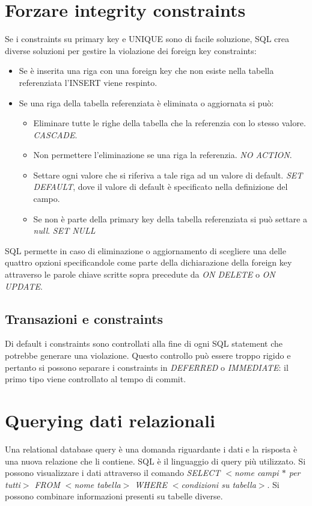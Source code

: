 \section{Forzare integrity constraints}
Se i constraints su primary key e UNIQUE sono di facile soluzione, SQL crea diverse soluzioni per gestire la violazione dei foreign key constraints: 
\begin{itemize}
\item Se \`e inserita una riga con una foreign key che non esiste nella tabella referenziata l'INSERT viene respinto.
\item Se una riga della tabella referenziata \`e eliminata o aggiornata si pu\`o:
\begin{itemize}
\item Eliminare tutte le righe della tabella che la referenzia con lo stesso valore. \emph{CASCADE}.
\item Non permettere l'eliminazione se una riga la referenzia. \emph{NO ACTION}.
\item Settare ogni valore che si riferiva a tale riga ad un valore di default. \emph{SET DEFAULT}, dove il valore di default \`e specificato nella definizione del campo.
\item Se non \`e parte della primary key della tabella referenziata si pu\`o settare a \emph{null}. \emph{SET NULL}
\end{itemize}
\end{itemize}
SQL permette in caso di eliminazione o aggiornamento di scegliere una delle quattro opzioni specificandole come parte della dichiarazione della foreign key attraverso le parole chiave scritte sopra precedute da
\emph{ON DELETE} o \emph{ON UPDATE}. 
\subsection{Transazioni e constraints}
Di default i constraints sono controllati alla fine di ogni SQL statement che potrebbe generare una violazione. Questo controllo pu\`o essere troppo rigido e pertanto si possono separare i constraints in 
\emph{DEFERRED} o \emph{IMMEDIATE}: il primo tipo viene controllato al tempo di commit.
\section{Querying dati relazionali}
Una relational database query \`e una domanda riguardante i dati e la risposta \`e una nuova relazione che li contiene. SQL \`e il linguaggio di query pi\`u utilizzato. Si possono visualizzare i dati attraverso il 
comando \emph{SELECT $<$nome campi $*$ per tutti$>$ FROM $<$nome tabella$>$ WHERE $<$condizioni su tabella$>$}. Si possono combinare informazioni presenti su tabelle diverse. 
